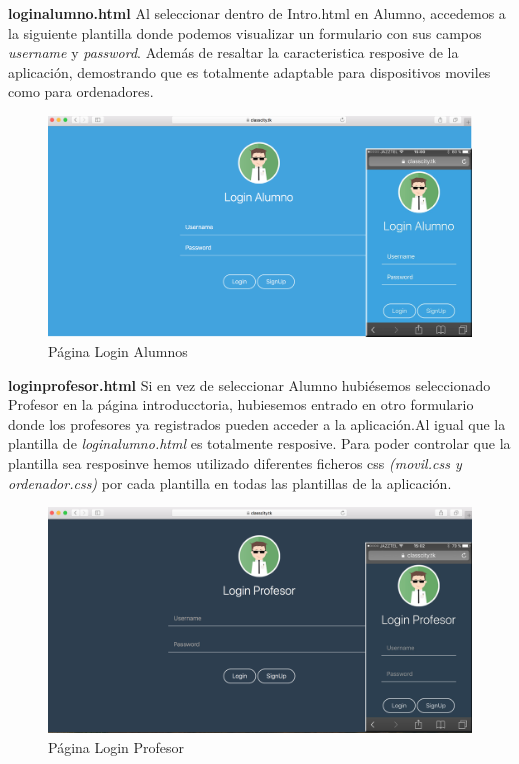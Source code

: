 \textbf{loginalumno.html} Al seleccionar dentro de Intro.html en Alumno, accedemos a la siguiente plantilla donde podemos visualizar un formulario con sus campos \textit{username} y \textit{password}. Además de resaltar la caracteristica resposive de la aplicación, demostrando que es totalmente adaptable para dispositivos moviles como para ordenadores.

\begin{figure}[!h]
    \centering
    \includegraphics[width=140mm]{img/templates/loginalumno.png}
    \caption{Página Login Alumnos}
    \label{img:loginalumnoclasscity}
\end{figure}


\textbf{loginprofesor.html} Si en vez de seleccionar Alumno hubiésemos seleccionado Profesor en la página introducctoria, hubiesemos entrado en otro formulario donde los profesores ya registrados pueden acceder a la aplicación.Al igual que la plantilla de \textit{loginalumno.html} es totalmente resposive. Para poder controlar que la plantilla sea resposinve hemos utilizado diferentes ficheros css \textit{(movil.css y ordenador.css)} por cada plantilla en todas las plantillas de la aplicación.
\begin{figure}[!h]
    \centering
    \includegraphics[width=140mm]{img/templates/loginprofesor.png}
    \caption{Página Login Profesor}
    \label{img:loginprofesorclasscity}
\end{figure}

